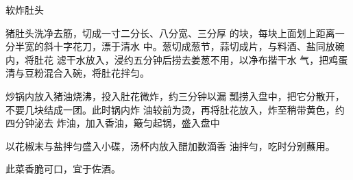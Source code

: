 \begin{recipe}{软炸肚头}

\ingredients


\cooking

\step 猪肚头洗净去筋，切成一寸二分长、八分宽、三分厚 的块，每块上面划上距离一分半宽的斜十字花刀，漂于清水 中。葱切成葱节，蒜切成片，与料酒、盐同放碗内，将肚花 滤干水放入，浸约五分钟后捞去姜葱不用，以净布揩干水 气，把鸡蛋清与豆粉混合入碗，将肚花拌匀。

\step 炒锅内放入猪油烧沸，投入肚花微炸，约三分钟以漏 瓢捞入盘中，把它分散开，不要几块结成一团。此时锅内炸 油较前为烫，再将肚花放入，炸至稍带黄色，约四分钟泌去 炸油，加入香油，簸匀起锅，盛入盘中

\step 以花椒末与盐拌匀盛入小碟，汤杯内放入醋加数滴香 油拌勻，吃时分别蘸用。

\notes

此菜香脆可口，宜于佐酒。

\end{recipe}


